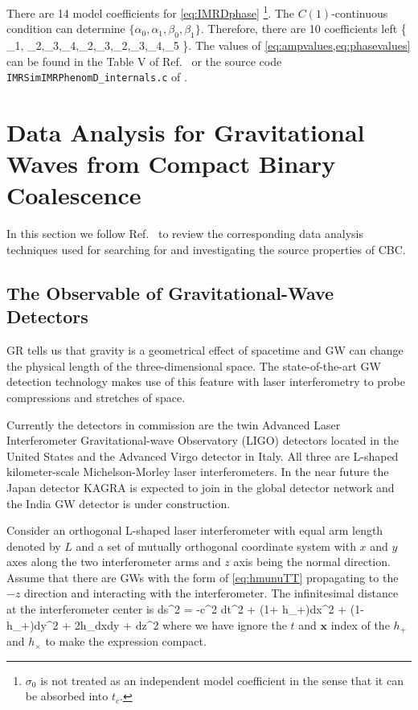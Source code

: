 There are 14 model coefficients for \cref{eq:IMRDphase} \footnote{$\sigma_0$ is not treated as an independent model coefficient in the sense that it can be absorbed into $t_c$.}.
The $C(1)$-continuous condition can determine $\{\alpha_0,\alpha_1,\beta_0,\beta_1\}$.
Therefore, there are 10 coefficients left 
\be \label{eq:phasevalues}
\{ \sigma_1, \sigma_2,\sigma_3,\sigma_4,\beta_2,\beta_3,\alpha_2,\alpha_3,\alpha_4,\alpha_5 \}.
\ee
The values of \cref{eq:ampvalues,eq:phasevalues} can be found in the Table V of Ref.~\cite{IMRPhenomD2} or the source code \texttt{IMRSimIMRPhenomD\_internals.c} of {\LAL}.

\section{Data Analysis for Gravitational Waves from Compact Binary Coalescence}

In this section we follow Ref.~\cite{maggiore2008gravitational} to review the corresponding data analysis techniques used for searching for and investigating the source properties of \ac{CBC}.

\subsection{The Observable of Gravitational-Wave Detectors}\label{sec:strain}

\ac{GR} tells us that gravity is a geometrical effect of spacetime and \ac{GW} can change the physical length of the three-dimensional space.
The state-of-the-art \ac{GW} detection technology makes use of this feature with laser interferometry to probe compressions and stretches of space.

Currently the detectors in commission are the twin Advanced Laser Interferometer Gravitational-wave Observatory (LIGO) detectors located in the United States and the Advanced Virgo detector in Italy.
All three are L-shaped kilometer-scale Michelson-Morley laser interferometers.
In the near future the Japan detector KAGRA is expected to join in the global detector network \cite{livingreviewligo} and the India \ac{GW} detector is under construction.

Consider an orthogonal L-shaped laser interferometer with equal arm length denoted by $L$ and a set of mutually orthogonal coordinate system with $x$ and $y$ axes along the two interferometer arms and $z$ axis being the normal direction.
Assume that there are \acp{GW} with the form of \cref{eq:hmunuTT} propagating to the $-z$ direction  and interacting with the interferometer.
The infinitesimal distance at the interferometer center  is
\be 
ds^2 = -c^2 dt^2 + (1+ h_+)dx^2 + (1-h_+)dy^2 + 2h_\times dxdy + dz^2
\ee
where we have ignore the $t$ and $\textbf{x}$ index of the $h_+$ and $h_\times$ to make the expression compact.

